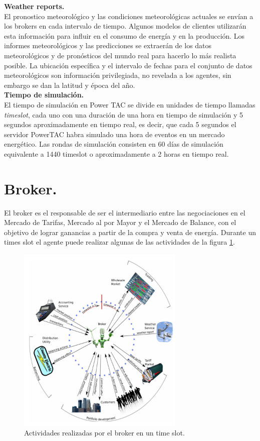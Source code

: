 \textbf{Weather reports.}\\

El pronostico meteorológico y las condiciones meteorológicas actuales se envían a los brokers en cada intervalo de tiempo. Algunos modelos de clientes utilizarán esta información para influir en el consumo de energía y en la producción. Los informes meteorológicos y las predicciones se extraerán de los datos meteorológicos y de pronósticos del mundo real para hacerlo lo más realista posible. La ubicación específica y el intervalo de fechas para el conjunto de datos meteorológicos son información privilegiada, no revelada a los agentes, sin embargo se dan la latitud y época del año.\\

\textbf{Tiempo de simulación.}\\

El tiempo de simulación en Power TAC se divide en unidades de tiempo llamadas \textit{timeslot}, cada uno con una duración de una hora en tiempo de simulación y 5 segundos aproximadamente en tiempo real, es decir, que cada 5 segundos el servidor PowerTAC habra simulado una hora de eventos en un mercado energético.
Las rondas de simulación consisten en 60 días de simulación equivalente a 1440 timeslot o aproximadamente a 2 horas en tiempo real.\\

\section{Broker.}

El broker es el responsable de ser el intermediario entre las negociaciones en el Mercado de Tarifas, Mercado al por Mayor y el Mercado de Balance, con el objetivo de lograr ganancias a partir de la compra y venta de energía. Durante un times slot el agente puede realizar algunas de las actividades de la figura \ref{fig:activity}.

\begin{figure}[!h]
	\centering
	\includegraphics[width=8cm]{img/process.png}
	\caption{Actividades realizadas por el broker en un time slot.}
	\label{fig:activity}
\end{figure}

